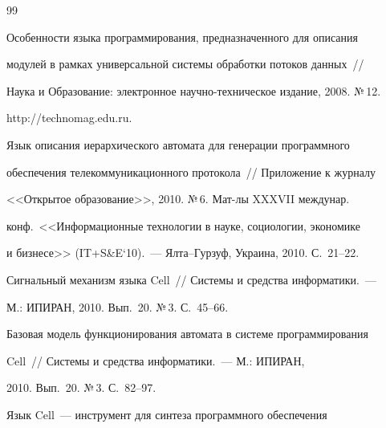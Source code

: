 {{\begin{thebibliography}{99}




Особенности языка программирования, предназначенного для описания 


модулей в рамках универсальной системы обработки потоков данных~/\!\!/ 


Наука и Образование: электронное научно-техническое издание, 2008.  №\,12.  


{\sf http://technomag.edu.ru}.









Язык описания иерархического автомата для генерации программного 


обеспечения телекоммуникационного протокола~/\!\!/ Приложение к журналу 


<<Открытое образование>>, 2010. №\,6.  Мат-лы XXXVII междунар.\ 


конф.\ <<Информационные технологии в науке, социологии, экономике 


и бизнесе>> (IT\;+\;S\&E`10).~--- Ялта--Гурзуф, Украина, 2010. С.~21--22.









Сигнальный механизм языка Cell~/\!\!/ Системы и средства информатики.~--- 


М.: ИПИРАН, 2010.  Вып.~20. №\,3. С.~45--66.









Базовая модель функционирования автомата в системе программирования 


Cell~/\!\!/ Системы и средства информатики.~--- М.: ИПИРАН, 


2010. Вып.~20. №\,3. С.~82--97.









Язык Cell~--- инструмент для синтеза программного обеспечения 



\end{thebibliography}}}
